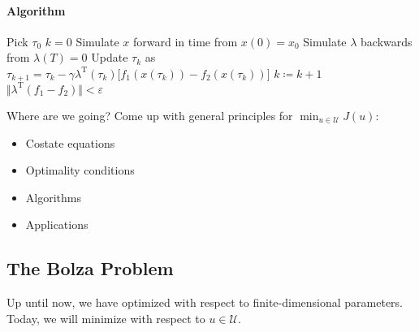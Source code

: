 \documentclass[letterpaper,12pt,titlepage]{report}
\newcommand{\trans}{^\text{T}}
\theoremstyle{plain}
\theoremstyle{definition}
\begin{document}
\paragraph{Algorithm} \mbox{}
\begin{algorithm}
  \begin{algorithmic}
    \State Pick $\tau_0$
    \State $k=0$
    \Repeat
    \State Simulate $x$ forward in time from $x(0)=x_0$
    \State Simulate $\lambda$ backwards from $\lambda(T)=0$
    \State Update $\tau_k$ as
    $ \tau_{k+1} = \tau_k - \gamma\lambda\trans(\tau_k) \big[ f_1(x(\tau_k)) - f_2(x(\tau_k)) \big] $
    \State $k\coloneqq k+1$
    \Until $\Vert \lambda\trans(f_1-f_2) \Vert < \varepsilon$
  \end{algorithmic}
\end{algorithm}

Where are we going? Come up with general principles for $\min_{u\in\mathcal U} J(u)$:
\begin{itemize}
\item Costate equations
\item Optimality conditions
\item Algorithms
\item Applications
\end{itemize}

\subsection{The Bolza Problem}
Up until now, we have optimized with respect to finite-dimensional parameters. Today, we will minimize with respect to $u\in\mathcal U$.
\end{document}
